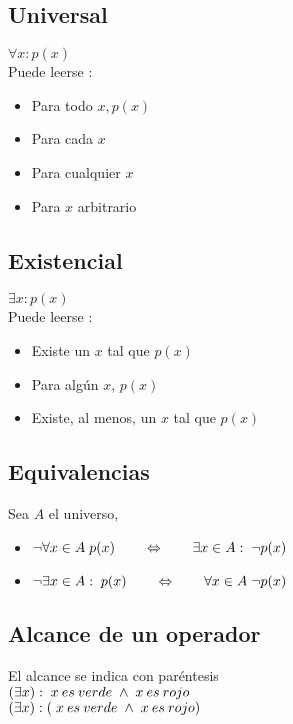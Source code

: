   \subsection{Universal}
    $\forall x : p(x) $ \\
    Puede leerse :
    \begin{itemize}
     \item Para todo $x, p(x)$
      \item Para cada $x$
       \item Para cualquier $x$
        \item Para $x$ arbitrario
    \end{itemize}

    
  \subsection{Existencial}
    $\exists x: p(x)$  \\
    Puede leerse :
    \begin{itemize}
    \item Existe un $x$ tal que  $p(x)$
      \item Para alg\'un $x$, $p(x)$
      \item Existe, al menos, un $x$ tal que $p(x)$
    \end{itemize}

  \subsection{Equivalencias}
  Sea $A$ el universo,
    \begin{itemize}
    \item $\neg \forall x \in A \thickspace p(x) \qquad \Leftrightarrow \qquad \exists x \in A: \thickspace \neg p(x) $ 
     \item $\neg \exists x \in A: \thickspace p(x) \qquad \Leftrightarrow \qquad \forall x \in A \thickspace \neg p(x)$
    \end{itemize}
    
    

  \subsection{Alcance de un operador}
El alcance se indica con par\'entesis\\
$(\exists x): \thickspace x \medspace es \medspace verde \thickspace  \wedge \thickspace x \medspace es \medspace rojo$ \\
$(\exists x): (\thickspace x \medspace es \medspace verde \thickspace \wedge \thickspace x \medspace es \medspace		 rojo)$ 
